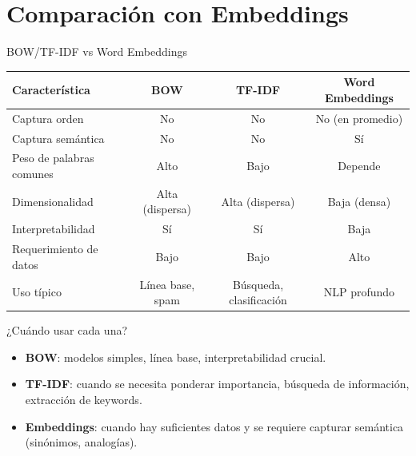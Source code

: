 \documentclass[aspectratio=169, 10pt, xcolor=table]{beamer}
\begin{document}
\section{Comparación con Embeddings}

\begin{frame}{BOW/TF-IDF vs Word Embeddings}
    \begin{table}
        \centering
        \begin{tabular}{l|c|c|c}
            \toprule
            \textbf{Característica} & \textbf{BOW} & \textbf{TF-IDF} & \textbf{Word Embeddings} \\
            \midrule
            Captura orden & No & No & No (en promedio) \\
            Captura semántica & No & No & Sí \\
            Peso de palabras comunes & Alto & Bajo & Depende \\
            Dimensionalidad & Alta (dispersa) & Alta (dispersa) & Baja (densa) \\
            Interpretabilidad & Sí & Sí & Baja \\
            Requerimiento de datos & Bajo & Bajo & Alto \\
            Uso típico & Línea base, spam & Búsqueda, clasificación & NLP profundo \\
            \bottomrule
        \end{tabular}
    \end{table}
\end{frame}

\begin{frame}{¿Cuándo usar cada una?}
    \begin{itemize}
        \item \textbf{BOW}: modelos simples, línea base, interpretabilidad crucial.
        \item \textbf{TF-IDF}: cuando se necesita ponderar importancia, búsqueda de información, extracción de keywords.
        \item \textbf{Embeddings}: cuando hay suficientes datos y se requiere capturar semántica (sinónimos, analogías).
    \end{itemize}
\end{frame}
\end{document}
